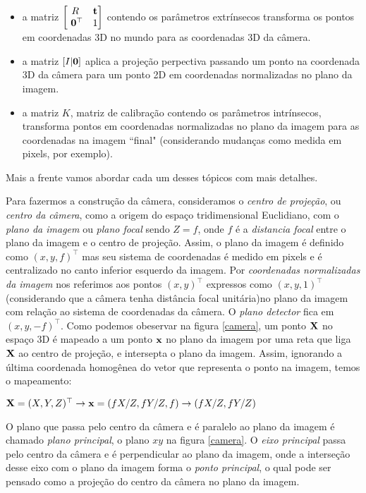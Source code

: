 \begin{itemize}
\item a matriz $\begin{bmatrix}
R&{\bf t}\\
\,\,{\bf 0}^\top &1
\end{bmatrix}$
contendo os parâmetros extrínsecos transforma os pontos em coordenadas 3D no mundo para as coordenadas 3D da câmera.
\item a matriz $[I|{\bf 0}]$ aplica a projeção perpectiva passando um ponto na coordenada 3D da câmera para um ponto 2D em coordenadas normalizadas no plano da imagem.
\item a matriz $K$, matriz de calibração contendo os parâmetros intrínsecos, transforma pontos em coordenadas normalizadas no plano da imagem para as coordenadas na imagem ``final" (considerando mudanças como medida em pixels, por exemplo).  
\end{itemize}
Mais a frente vamos abordar cada um desses tópicos com mais detalhes.

Para fazermos a construção da câmera, consideramos o \textit{centro de projeção}, ou \textit{centro da câmera}, como a origem do espaço tridimensional Euclidiano, com o \textit{plano da imagem} ou \textit{plano focal} sendo $Z = f$, onde $f$ é a \textit{distancia focal} entre o plano da imagem e o centro de projeção. Assim, o plano da imagem é definido como $(x,y,f)^\top$ mas seu sistema de coordenadas é medido em pixels e é centralizado no canto inferior esquerdo da imagem. Por \textit{coordenadas normalizadas da imagem} nos referimos aos pontos $(x,y)^\top$ expressos como $(x,y,1)^\top$ (considerando que a câmera tenha distância focal unitária)no plano da imagem com relação ao sistema de coordenadas da câmera. O \textit{plano detector} fica em $(x,y,-f)^\top$. Como podemos obeservar na figura \ref{camera}, um ponto $\mathbf{X}$ no espaço 3D é mapeado a um ponto $\mathbf{x}$ no plano da imagem por uma reta que liga $\mathbf{X}$ ao centro de projeção, e intersepta o plano da imagem. Assim, ignorando a última coordenada homogênea do vetor que representa o ponto na imagem, temos o mapeamento:

\begin{center}
$\mathbf{X} = (X,Y,Z)^\top \rightarrow \mathbf{x} = (fX/Z,fY/Z,f) \rightarrow (fX/Z,fY/Z)$  
\end{center}

O plano que passa pelo centro da câmera e é paralelo ao plano da imagem é chamado \textit{plano principal}, o plano $xy$ na figura \ref{camera}. O \textit{eixo principal} passa pelo centro da câmera e é perpendicular ao plano da imagem, onde a interseção desse eixo com o plano da imagem forma o \textit{ponto principal}, o qual pode ser pensado como a projeção do centro da câmera no plano da imagem.


